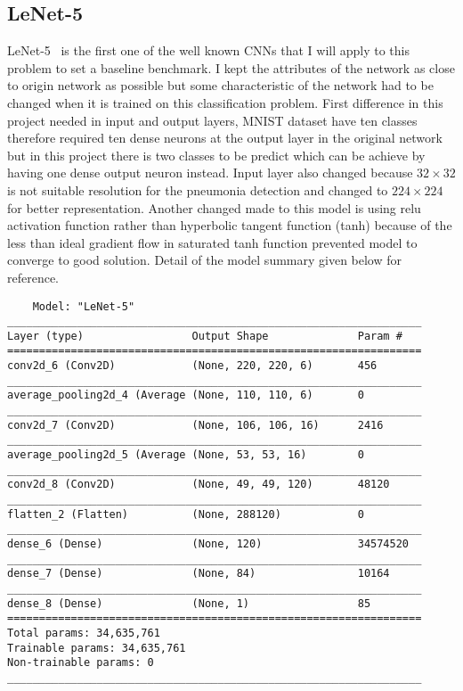 \subsection{LeNet-5}
LeNet-5~\cite{Lenet5} is the first one of the well known CNNs that I will apply to this problem to set a baseline benchmark.
I kept the attributes of the network as close to origin network as possible but some characteristic of the network had to be changed when it is trained on this classification problem.
First difference in this project needed in input and output layers, MNIST dataset have ten classes therefore required ten dense neurons at the output layer in the original network but in this project there is two classes to be predict which can be achieve by having one dense output neuron instead.
Input layer also changed because $32 \times 32$ is not suitable resolution for the pneumonia detection and changed to $224 \times 224$ for better representation.
Another changed made to this model is using relu activation function rather than hyperbolic tangent function (tanh) because of the less than ideal gradient flow in saturated tanh function prevented model to converge to good solution.
Detail of the model summary given below for reference.

\begin{verbatim}
    Model: "LeNet-5"
_________________________________________________________________
Layer (type)                 Output Shape              Param #   
=================================================================
conv2d_6 (Conv2D)            (None, 220, 220, 6)       456       
_________________________________________________________________
average_pooling2d_4 (Average (None, 110, 110, 6)       0         
_________________________________________________________________
conv2d_7 (Conv2D)            (None, 106, 106, 16)      2416      
_________________________________________________________________
average_pooling2d_5 (Average (None, 53, 53, 16)        0         
_________________________________________________________________
conv2d_8 (Conv2D)            (None, 49, 49, 120)       48120     
_________________________________________________________________
flatten_2 (Flatten)          (None, 288120)            0         
_________________________________________________________________
dense_6 (Dense)              (None, 120)               34574520  
_________________________________________________________________
dense_7 (Dense)              (None, 84)                10164     
_________________________________________________________________
dense_8 (Dense)              (None, 1)                 85        
=================================================================
Total params: 34,635,761
Trainable params: 34,635,761
Non-trainable params: 0
_________________________________________________________________
\end{verbatim}

